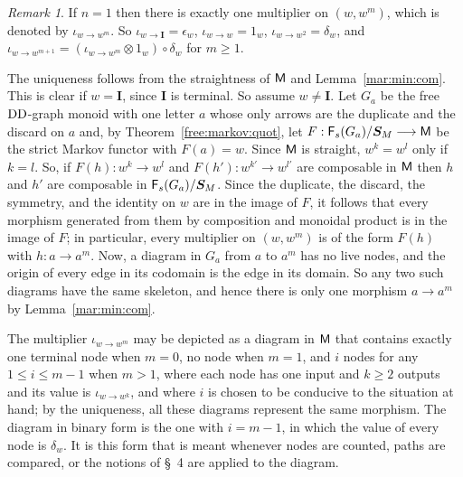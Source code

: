 \documentclass[12pt]{amsart}
\theoremstyle{plain}
\theoremstyle{definition}
\theoremstyle{remark}
\newtheorem{rem}[thm]{Remark}
\numberwithin{equation}{section}
\theoremstyle{plain}
\newcommand{\0}{\emptyset}
\newcommand{\fun}{\longrightarrow}
\newcommand{\cat}[1]{\textup{\textsf{#1}}}
\newcommand{\moi}{\mathbf{I}}
\newcommand{\DD}{\textup{DD}}
\begin{document}
\begin{rem}\label{mul:pow}
If $n = 1$ then there is exactly one multiplier on $(w, w^m)$, which is denoted by $\iota_{w \rightarrow w^m}$. So $\iota_{w \rightarrow \moi} = \epsilon_w$, $\iota_{w \rightarrow w} = 1_w$, $\iota_{w \rightarrow w^2} = \delta_w$, and $\iota_{w \rightarrow w^{m+1}} = (\iota_{w \rightarrow w^m} \otimes 1_w) \circ \delta_w$ for $m \geq 1$.

The uniqueness follows from the straightness of $\cat M$ and Lemma~\ref{mar:min:com}. This is clear if $w = \moi$, since $\moi$ is terminal. So assume $w \neq \moi$. Let $G_a$ be the free $\DD$-graph monoid with one letter $a$ whose only arrows are the duplicate and the discard on $a$ and, by Theorem~\ref{free:markov:quot}, let $F : \cat F_s(G_a) / \bm S_M \fun \cat M$ be the strict Markov functor with $F(a) = w$. Since $\cat M$ is straight, $w^k = w^l$ only if $k = l$. So, if $F(h) : w^k \fun w^l$ and $F(h') : w^{k'} \fun w^{l'}$ are composable in $\cat M$ then $h$ and $h'$ are composable in $\cat F_s(G_a) / \bm S_M$. Since the duplicate, the discard, the symmetry, and the identity on $w$ are in the image of $F$, it follows that every morphism generated from them by composition and monoidal product is in the image of $F$; in particular, every multiplier on $(w, w^m)$ is of the form $F(h)$ with $h : a \fun a^m$. Now, a diagram in $G_a$ from $a$ to $a^m$ has no live nodes, and the origin of every edge in its codomain is the edge in its domain. So any two such diagrams have the same skeleton, and hence there is only one morphism $a \fun a^m$ by Lemma~\ref{mar:min:com}.

The multiplier $\iota_{w \rightarrow w^m}$ may be depicted as a diagram in $\cat M$ that contains exactly one terminal node when $m = 0$, no node when $m = 1$, and $i$ nodes for any $1 \leq i \leq m - 1$ when $m > 1$, where each node has one input and $k \geq 2$ outputs and its value is $\iota_{w \rightarrow w^k}$, and where $i$ is chosen to be conducive to the situation at hand; by the uniqueness, all these diagrams represent the same morphism. The diagram in binary form is the one with $i = m - 1$, in which the value of every node is $\delta_w$. It is this form that is meant whenever nodes are counted, paths are compared, or the notions of \S~4 are applied to the diagram.
\end{rem}
\end{document}
